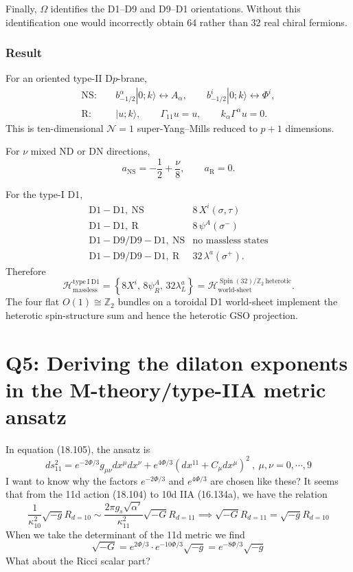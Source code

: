 \documentclass[
  10pt,
  a4paper,
  openany]{book}
\begin{document}
Finally, \(\Omega\) identifies the D1--D9 and D9--D1 orientations.
Without this identification one would incorrectly obtain 64 rather than
32 real chiral fermions.

\subsubsection{Result}\label{result-39}

For an oriented type-II D\(p\)-brane, \[
\boxed{
\begin{aligned}
\mathrm{NS}:&\quad
b_{-1/2}^{\alpha}|0;k\rangle
\leftrightarrow A_\alpha,
\qquad
b_{-1/2}^{i}|0;k\rangle
\leftrightarrow\Phi^i,\\
\mathrm R:&\quad
|u;k\rangle,
\qquad
\Gamma_{11}u=u,
\qquad
k_\alpha\Gamma^\alpha u=0.
\end{aligned}
}
\] This is ten-dimensional \(\mathcal N=1\) super-Yang--Mills reduced to
\(p+1\) dimensions.

For \(\nu\) mixed ND or DN directions, \[
\boxed{
a_{\mathrm{NS}}
=-\frac12+\frac{\nu}{8},
\qquad
a_{\mathrm R}=0
}.
\]

For the type-I D1, \[
\boxed{
\begin{array}{c|c}
\mathrm{D1-D1,\ NS}
&8\,X^i(\sigma,\tau)\\
\mathrm{D1-D1,\ R}
&8\,\psi^A(\sigma^-)\\
\mathrm{D1-D9/D9-D1,\ NS}
&\text{no massless states}\\
\mathrm{D1-D9/D9-D1,\ R}
&32\,\lambda^a(\sigma^+).
\end{array}
}
\] Therefore \[
\boxed{
\mathcal H_{\mathrm{massless}}^{\mathrm{type\ I\ D1}}
=
\left\{
8X^i,\,
8\psi^A_R,\,
32\lambda^a_L
\right\}
=
\mathcal H_{\mathrm{world\text{-}sheet}}^{
\operatorname{Spin}(32)/\mathbb Z_2\ \mathrm{heterotic}}
}.
\] The four flat \(O(1)\cong\mathbb Z_2\) bundles on a toroidal D1
world-sheet implement the heterotic spin-structure sum and hence the
heterotic GSO projection.

\section{Q5: Deriving the dilaton exponents in the M-theory/type-IIA
metric
ansatz}\label{q5-deriving-the-dilaton-exponents-in-the-m-theorytype-iia-metric-ansatz}

In equation (18.105), the ansatz is \[
ds_{11}^2=e^{-2\Phi/3}g_{\mu \nu}dx^\mu dx^\nu+e^{4\Phi/3}(dx^{11}+C_{\mu}dx^\mu)^2 \ , \ \mu,\nu=0,\cdots,9
\] I want to know why the factors \(e^{-2\Phi/3}\) and \(e^{4\Phi/3}\)
are chosen like these? It seems that from the 11d action (18.104) to 10d
IIA (16.134a), we have the relation \[
\frac{1}{\kappa_{10}^2}\sqrt{ -g }R_{d=10}\sim \frac{2\pi g_{s}\sqrt{ \alpha' } }{\kappa_{11}^2}\sqrt{ -G }R_{d=11} \implies \sqrt{ -G }R_{d=11}=\sqrt{ -g }R_{d=10}
\] When we take the determinant of the 11d metric we find \[
\sqrt{ -G }=e^{2\Phi/3}\cdot e^{-10\Phi/3}\sqrt{ -g }=e^{-8\Phi/3}\sqrt{ -g }
\] What about the Ricci scalar part?
\end{document}
